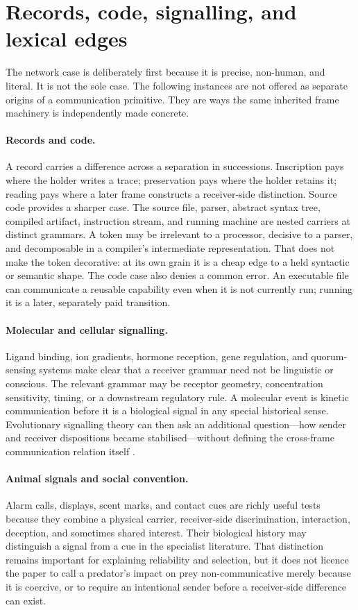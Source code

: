 \documentclass[11pt,a4paper]{article}
\theoremstyle{remark}\newtheorem{remark}[definition]{Remark}
\begin{document}
\section{Records, code, signalling, and lexical edges}\label{sec:instances}

The network case is deliberately first because it is precise, non-human, and
literal. It is not the sole case. The following instances are not offered as
separate origins of a communication primitive. They are ways the same inherited
frame machinery is independently made concrete.

\paragraph{Records and code.} A record carries a difference across a separation in
successions. Inscription pays where the holder writes a trace; preservation pays
where the holder retains it; reading pays where a later frame constructs a
receiver-side distinction. Source code provides a sharper case. The source file,
parser, abstract syntax tree, compiled artifact, instruction stream, and running
machine are nested carriers at distinct grammars. A token may be irrelevant to a
processor, decisive to a parser, and decomposable in a compiler's intermediate
representation. That does not make the token decorative: at its own grain it is a
cheap edge to a held syntactic or semantic shape. The code case also denies a
common error. An executable file can communicate a reusable capability even when
it is not currently run; running it is a later, separately paid transition.

\paragraph{Molecular and cellular signalling.} Ligand binding, ion gradients,
hormone reception, gene regulation, and quorum-sensing systems make clear that a
receiver grammar need not be linguistic or conscious. The relevant grammar may
be receptor geometry, concentration sensitivity, timing, or a downstream
regulatory rule. A molecular event is kinetic communication before it is a
biological signal in any special historical sense. Evolutionary signalling theory
can then ask an additional question---how sender and receiver dispositions became
stabilised---without defining the cross-frame communication relation itself
\citep{maynardsmithharper2003,scottphillips2008}.

\paragraph{Animal signals and social convention.} Alarm calls, displays, scent
marks, and contact cues are richly useful tests because they combine a physical
carrier, receiver-side discrimination, interaction, deception, and sometimes
shared interest. Their biological history may distinguish a signal from a cue in
the specialist literature. That distinction remains important for explaining
reliability and selection, but it does not licence the paper to call a predator's
impact on prey non-communicative merely because it is coercive, or to require an
intentional sender before a receiver-side difference can exist.
\end{document}
